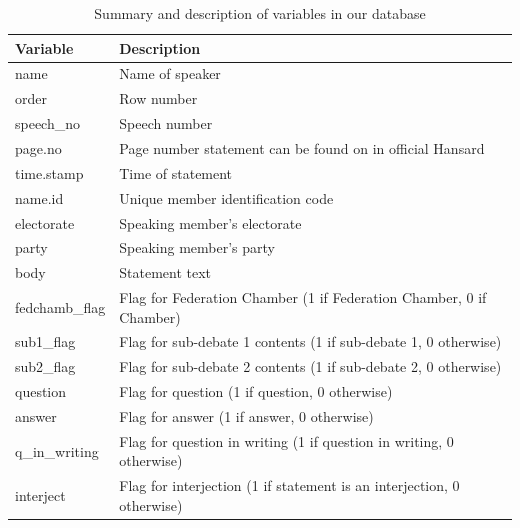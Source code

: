 \documentclass[
  letterpaper,
  DIV=11,
  numbers=noendperiod]{scrartcl}
\begin{document}
\hypertarget{tbl-vars}{}
\begin{table}[H]
\caption{\label{tbl-vars}Summary and description of variables in our database }\tabularnewline

\centering
\begin{tabular}{ll}
\toprule
Variable & Description\\
\midrule
name & Name of speaker\\
order & Row number\\
speech\_no & Speech number\\
page.no & Page number statement can be found on in official Hansard\\
time.stamp & Time of statement\\
\addlinespace
name.id & Unique member identification code\\
electorate & Speaking member's electorate\\
party & Speaking member's party\\
body & Statement text\\
fedchamb\_flag & Flag for Federation Chamber (1 if Federation Chamber, 0 if Chamber)\\
\addlinespace
sub1\_flag & Flag for sub-debate 1 contents (1 if sub-debate 1, 0 otherwise)\\
sub2\_flag & Flag for sub-debate 2 contents (1 if sub-debate 2, 0 otherwise)\\
question & Flag for question (1 if question, 0 otherwise)\\
answer & Flag for answer (1 if answer, 0 otherwise)\\
q\_in\_writing & Flag for question in writing (1 if question in writing, 0 otherwise)\\
\addlinespace
interject & Flag for interjection (1 if statement is an interjection, 0 otherwise)\\
\bottomrule
\end{tabular}
\end{table}
\end{document}

